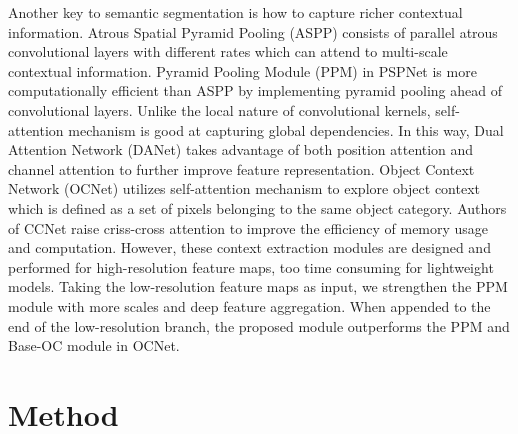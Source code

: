 \documentclass[journal]{IEEEtran}
\begin{document}
Another key to semantic segmentation is how to capture richer contextual information. Atrous Spatial Pyramid Pooling (ASPP)\cite{chen2017deeplab} consists of parallel atrous convolutional layers with different rates which can attend to multi-scale contextual information. Pyramid Pooling Module (PPM)\cite{zhao2017pyramid} in PSPNet is more computationally efficient than ASPP by implementing pyramid pooling ahead of convolutional layers. Unlike the local nature of convolutional kernels, self-attention mechanism is good at capturing global dependencies. In this way, Dual Attention Network (DANet)\cite{fu2019dual} takes advantage of both position attention and channel attention to further improve feature representation. Object Context Network (OCNet)\cite{yuan2018ocnet} utilizes self-attention mechanism to explore object context which is defined as a set of pixels belonging to the same object category. Authors of CCNet\cite{huang2019ccnet} raise criss-cross attention to improve the efficiency of memory usage and computation. However, these context extraction modules are designed and performed for high-resolution feature maps, too time consuming for lightweight models. Taking the low-resolution feature maps as input, we strengthen the PPM module with more scales and deep feature aggregation. When appended to the end of the low-resolution branch, the proposed module outperforms the PPM and Base-OC module in OCNet.


\section{Method}
\end{document}
